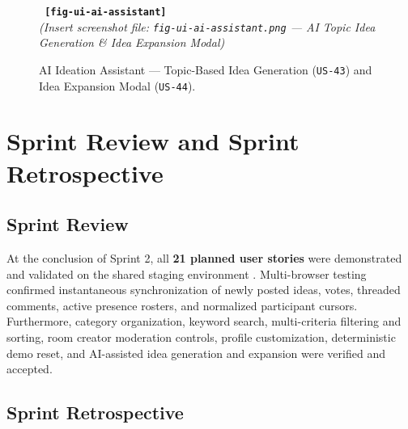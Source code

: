 \begin{figure}[htbp]
    \centering
    \begin{screenshotplaceholder}
        \texttt{\bfseries\color{mindNavy} [fig-ui-ai-assistant]}\\[4pt]
        \small\textit{\color{mindSlate}(Insert screenshot file: \texttt{fig-ui-ai-assistant.png} — AI Topic Idea Generation \& Idea Expansion Modal)}
    \end{screenshotplaceholder}
    \caption{AI Ideation Assistant — Topic-Based Idea Generation (\texttt{US-43}) and Idea Expansion Modal (\texttt{US-44}).}
    \label{fig:ui-ai}
\end{figure}

\section{Sprint Review and Sprint Retrospective}

\subsection{Sprint Review}

At the conclusion of Sprint 2, all \textbf{21 planned user stories} were demonstrated and validated on the shared staging environment \cite{backlog}. Multi-browser testing confirmed instantaneous synchronization of newly posted ideas, votes, threaded comments, active presence rosters, and normalized participant cursors. Furthermore, category organization, keyword search, multi-criteria filtering and sorting, room creator moderation controls, profile customization, deterministic demo reset, and AI-assisted idea generation and expansion were verified and accepted.

\subsection{Sprint Retrospective}

